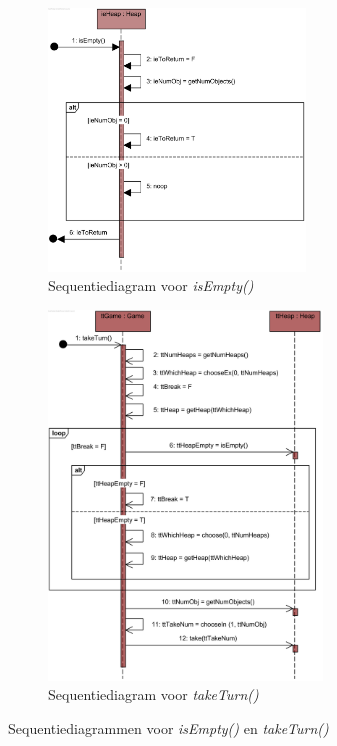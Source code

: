 	\begin{landscape}
		\newpage
		\thispagestyle{empty}
		
		\begin{figure}
			\begin{subfigure}{\textwidth}
				\includegraphics[width=0.75\textwidth]{chap-evaluatie/isEmpty.png}
				\caption{Sequentiediagram voor \textit{isEmpty()}}
				\label{fig:nim-isEmpty}
			\end{subfigure}%
			\begin{subfigure}{\textwidth}
				\includegraphics[width=0.8\textwidth]{chap-evaluatie/takeTurn.png}
				\caption{Sequentiediagram voor \textit{takeTurn()}}
				\label{fig:nim-takeTurn}
			\end{subfigure}
			\caption{Sequentiediagrammen voor \textit{isEmpty()} en \textit{takeTurn()}}
			\label{fig:nim-isempty-tt}
		\end{figure}
	\end{landscape}

